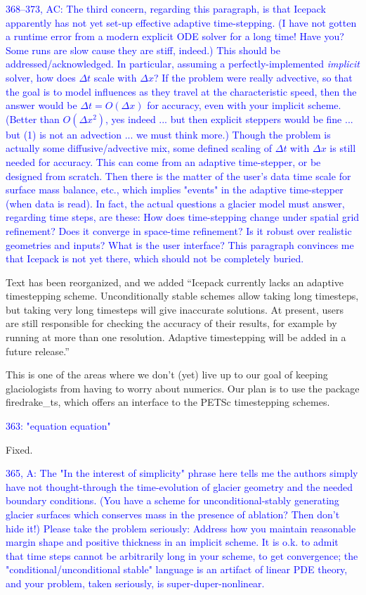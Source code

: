 \documentclass{article}
\theoremstyle{definition}
\theoremstyle{plain}
\begin{document}
\textcolor{blue}{368--373, AC:  The third concern, regarding this paragraph, is that Icepack apparently has not yet set-up effective adaptive time-stepping.  (I have not gotten a runtime error from a modern explicit ODE solver for a long time!  Have you?  Some runs are slow cause they are stiff, indeed.)  This should be addressed/acknowledged.  In particular, assuming a perfectly-implemented \emph{implicit} solver, how does $\Delta t$ scale with $\Delta x$?  If the problem were really advective, so that the goal is to model influences as they travel at the characteristic speed, then the answer would be $\Delta t = O(\Delta x)$ for accuracy, even with your implicit scheme.  (Better than $O(\Delta x^2)$, yes indeed ... but then explicit steppers would be fine ... but (1) is not an advection ... we must think more.)  Though the problem is actually some diffusive/advective mix, some defined scaling of $\Delta t$ with $\Delta x$ is still needed for accuracy.  This can come from an adaptive time-stepper, or be designed from scratch.  Then there is the matter of the user's data time scale for surface mass balance, etc., which implies "events" in the adaptive time-stepper (when data is read).  In fact, the actual questions a glacier model must answer, regarding time steps, are these:  How does time-stepping change under spatial grid refinement?  Does it converge in space-time refinement?  Is it robust over realistic geometries and inputs?  What is the user interface?  This paragraph convinces me that Icepack is not yet there, which should not be completely buried.}

Text has been reorganized, and we added ``Icepack currently lacks an adaptive timestepping scheme.
Unconditionally stable schemes allow taking long timesteps, but taking very long timesteps will give inaccurate solutions.
At present, users are still responsible for checking the accuracy of their results, for example by running at more than one resolution.
Adaptive timestepping will be added in a future release.''

This is one of the areas where we don't (yet) live up to our goal of keeping glaciologists from having to worry about numerics.
Our plan is to use the package firedrake\_ts, which offers an interface to the PETSc timestepping schemes.

\textcolor{blue}{363:  "equation equation"}

Fixed.

\textcolor{blue}{365, A:  The "In the interest of simplicity" phrase here tells me the authors simply have not thought-through the time-evolution of glacier geometry and the needed boundary conditions.  (You have a scheme for unconditional-stably generating glacier surfaces which conserves mass in the presence of ablation?  Then don't hide it!)  Please take the problem seriously:  Address how you maintain reasonable margin shape and positive thickness in an implicit scheme.  It is o.k. to admit that time steps cannot be arbitrarily long in your scheme, to get convergence; the "conditional/unconditional stable" language is an artifact of linear PDE theory, and your problem, taken seriously, is super-duper-nonlinear.}
\end{document}
